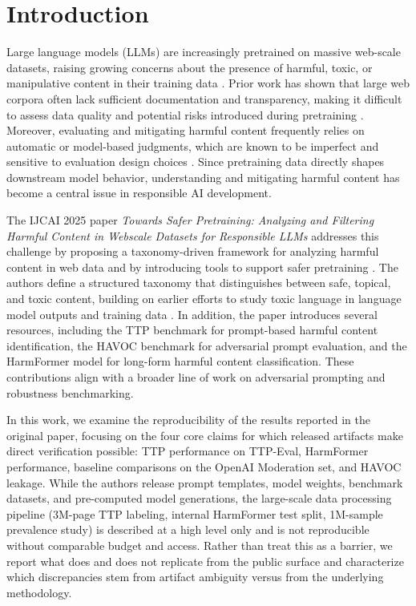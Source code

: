 \documentclass[10pt]{article} %
\begin{document}
\section{Introduction}
\label{sec:intro}

Large language models (LLMs) are increasingly pretrained on massive web-scale datasets, raising growing concerns about the presence of harmful, toxic, or manipulative content in their training data \citep{bender2021stochasticparrots}. Prior work has shown that large web corpora often lack sufficient documentation and transparency, making it difficult to assess data quality and potential risks introduced during pretraining \citep{dodge2021c4}. Moreover, evaluating and mitigating harmful content frequently relies on automatic or model-based judgments, which are known to be imperfect and sensitive to evaluation design choices \citep{welbl2021detoxchallenges}. Since pretraining data directly shapes downstream model behavior, understanding and mitigating harmful content has become a central issue in responsible AI development.

The IJCAI 2025 paper \textit{Towards Safer Pretraining: Analyzing and Filtering Harmful Content in Webscale Datasets for Responsible LLMs} addresses this challenge by proposing a taxonomy-driven framework for analyzing harmful content in web data and by introducing tools to support safer pretraining \citep{mendu2025saferpretraining}. The authors define a structured taxonomy that distinguishes between safe, topical, and toxic content, building on earlier efforts to study toxic language in language model outputs and training data \citep{gehman2020realtoxicityprompts}. In addition, the paper introduces several resources, including the TTP benchmark for prompt-based harmful content identification, the HAVOC benchmark for adversarial prompt evaluation, and the HarmFormer model for long-form harmful content classification. These contributions align with a broader line of work on adversarial prompting and robustness benchmarking.

In this work, we examine the reproducibility of the results reported in the original paper, focusing on the four core claims for which released artifacts make direct verification possible: TTP performance on TTP-Eval, HarmFormer performance, baseline comparisons on the OpenAI Moderation set, and HAVOC leakage. While the authors release prompt templates, model weights, benchmark datasets, and pre-computed model generations, the large-scale data processing pipeline (3M-page TTP labeling, internal HarmFormer test split, 1M-sample prevalence study) is described at a high level only and is not reproducible without comparable budget and access. Rather than treat this as a barrier, we report what does and does not replicate from the public surface and characterize which discrepancies stem from artifact ambiguity versus from the underlying methodology.
\end{document}

